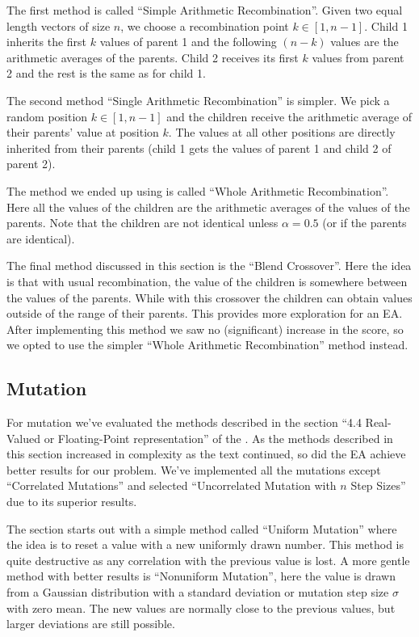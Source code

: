 The first method is called ``Simple Arithmetic Recombination''. Given two equal length vectors of
size $n$, we choose a recombination point $k \in [1, n - 1]$. Child 1 inherits the first $k$ values
of parent 1 and the following $(n - k)$ values are the arithmetic averages of the parents. Child 2
receives its first $k$ values from parent 2 and the rest is the same as for child 1.

The second method ``Single Arithmetic Recombination'' is simpler. We pick a random position $k \in
[1, n - 1]$ and the children receive the arithmetic average of their parents' value at position $k$.
The values at all other positions are directly inherited from their parents (child 1 gets the values
of parent 1 and child 2 of parent 2).

The method we ended up using is called ``Whole Arithmetic Recombination''. Here all the values of
the children are the arithmetic averages of the values of the parents. Note that the children are
not identical unless $\alpha = 0.5$ (or if the parents are identical).

The final method discussed in this section is the ``Blend Crossover''. Here the idea is that with
usual recombination, the value of the children is somewhere between the values of the parents. While
with this crossover the children can obtain values outside of the range of their parents. This
provides more exploration for an EA. After implementing this method we saw no (significant) increase
in the score, so we opted to use the simpler ``Whole Arithmetic Recombination'' method instead.

\subsection{Mutation} \label{sec:mutation}
For mutation we've evaluated the methods described in the section ``4.4 Real-Valued or
Floating-Point representation'' of the \book. As the
methods described in this section increased in complexity as the text continued, so did the EA
achieve better results for our problem. We've implemented all the mutations except ``Correlated
Mutations'' and selected ``Uncorrelated Mutation with $n$ Step Sizes'' due to its superior results.

The section starts out with a simple method called ``Uniform Mutation'' where the idea is to reset a
value with a new uniformly drawn number. This method is quite destructive as any correlation with
the previous value is lost. A more gentle method with better results is ``Nonuniform Mutation'',
here the value is drawn from a Gaussian distribution with a standard deviation or mutation step size
$\sigma$ with zero mean. The new values are normally close to the previous values, but larger
deviations are still possible.

